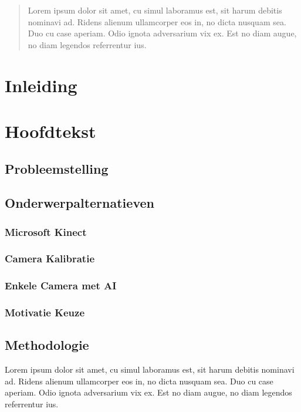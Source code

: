 \documentclass[a4paper,11pt]{article}
\begin{document}
	\begin{abstract}
		Lorem ipsum dolor sit amet, cu simul laboramus est, sit harum debitis nominavi ad. Ridens alienum ullamcorper eos in, no dicta nusquam sea. Duo cu case aperiam. Odio ignota adversarium vix ex. Est no diam augue, no diam legendos referrentur ius.
	\end{abstract}
		
		
		
	\tableofcontents
	\newpage
	
	





	
	
	\section{Inleiding}
	
	\section{Hoofdtekst}
	\subsection{Probleemstelling}
	\subsection{Onderwerpalternatieven}
	\subsubsection{Microsoft Kinect}
	\subsubsection{Camera Kalibratie}
	\subsubsection{Enkele Camera met AI}
	\subsubsection{Motivatie Keuze}
	\subsection{Methodologie}
		Lorem ipsum dolor sit amet, cu simul laboramus est, sit harum debitis nominavi ad. Ridens alienum ullamcorper eos in, no dicta nusquam sea. Duo cu case aperiam. Odio ignota adversarium vix ex. Est no diam augue, no diam legendos referrentur ius.
		
\end{document}
